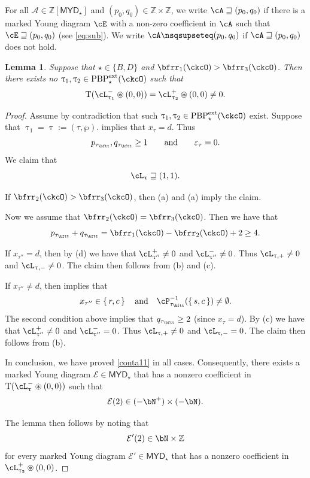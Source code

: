 \documentclass[11pt,a4paper]{amsart}
\def\MYD{{\mathsf{MYD}}}
\newcommand{\CA}{{\mathcal {A}}}
\newcommand{\CE}{{\mathcal {E}}}
\newcommand{\Z}{\mathbb{Z}}
\newcommand{\be}{\begin {equation}}
\newcommand{\ee}{\end {equation}}
\numberwithin{equation}{section}
\newtheorem{lem}[thm]{Lemma}
\theoremstyle{remark}
\def\PBPes{\mathrm{PBP}^{\mathrm{ext}}_{\star}}
\def\maltese{\mathrm{T}}
\def\MYD{{\mathsf{MYD}}}
\def\pac#1{\ac_{#1}^+}
\def\nac#1{\ac_{#1}^-}
\def\ac{\cL}
\begin{document}
For all $\CA\in \Z[\MYD_\star]$ and $(p_0,q_0)\in \Z\times \Z$, we write $\cA \sqsupseteq (p_{0},q_{0})$ if there is a marked Young diagram $\cE$ with
a non-zero coefficient in $\cA$ such that $\cE\sqsupseteq (p_{0},q_{0})$ (see \eqref{eq:sub}). We write $\cA \nsqsupseteq (p_{0},q_{0})$ if $\cA \sqsupseteq (p_{0},q_{0})$ does not hold.
\begin{lem}\label{lempn0}
Suppose that $\star\in \{B,D\}$ and   $\bfrr_{1}(\ckcO)> \bfrr_{3}(\ckcO)$. Then there exists no $\uptau_1, \uptau_2\in \PBPes(\ckcO)$ such that
    \begin{equation}\label{eq:pnac}
    \maltese (\nac{\uptau_1}\circledast (0,0)) =\pac{\uptau_2} \circledast (0,0) \neq 0.
     \end{equation}
\end{lem}
\begin{proof}
Assume by contradiction that such $\uptau_1, \uptau_2\in \PBPes(\ckcO)$ exist. Suppose that $\uptau_1=\uptau:=(\tau,\wp)$.  implies that $x_\tau=d$. Thus
\[
  p_{\tau_\bftt}, q_{\tau_\bftt}\geq 1\qquad\textrm{and}\qquad \varepsilon_\tau=0.
\]
We claim that \be\label{conta11}
 \ac_{\uptau}\sqsupseteq (1,1).
 \ee

If $\bfrr_2(\ckcO)>\bfrr_3(\ckcO)$, then  (a) and
 (a) imply the claim.

Now we assume  that $\bfrr_2(\ckcO)=\bfrr_3(\ckcO)$. Then we have that
\be\label{pplusq00}
p_{\tau_\bftt}+q_{\tau_\bftt}=\bfrr_1(\ckcO)-\bfrr_2(\ckcO)+2\geq 4.
\ee

If $x_{\tau''}=d$, then by  (d) we have that $\ac_{\uptau''}^+\neq 0$ and $\ac_{\uptau''}^-\neq 0$. Thus $\ac_{\uptau,+}\neq 0$ and $\ac_{\uptau,-}\neq 0$. The claim then follows from  (b) and (c).

If $x_{\tau''}\neq d$, then  implies that
\be\label{taunotd2}
x_{\tau''}\in \set{r,c}\quad\textrm{and}\quad
    \cP_{\tau_\bftt}^{-1}(\set{s,c})\neq \emptyset.
    \ee
The second condition above implies that $q_{\tau_\bftt}\geq 2$ (since $x_\tau=d$).  By  (c) we have that $\ac_{\uptau''}^+\neq 0$ and $\ac_{\uptau''}^-= 0$. Thus $\ac_{\uptau,+}\neq 0$ and $\ac_{\uptau,-}= 0$. The claim then follows from  (b).

 In conclusion, we have proved \eqref{conta11} in all cases.
 Consequently, there exists a marked Young diagram $\CE\in \MYD_\star$ that has a nonzero coefficient in $\maltese (\nac{\uptau}\circledast (0,0))$ such that
 \[
   \CE(2)\in (-\bN^+)\times (-\bN).
 \]

The lemma then follows by noting  that
\[
   \CE'(2)\in \bN\times \Z
 \]
 for every marked Young diagram $\CE'\in \MYD_\star$ that has a nonzero coefficient in $\pac{\uptau_2} \circledast (0,0)$.
 \end{proof}
\end{document}
